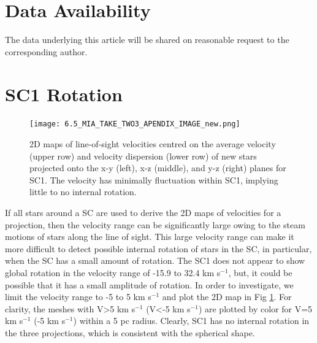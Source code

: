 \documentclass[fleqn,usenatbib]{mnras}
\begin{document}
\section*{Data Availability}

The data underlying this article will be shared on reasonable request to the corresponding author.













\appendix
\section{SC1 Rotation}

\begin{figure}
 \texttt{[image: 6.5\_MIA\_TAKE\_TWO3\_APENDIX\_IMAGE\_new.png]}
 \caption{2D maps of line-of-sight velocities centred on the average velocity (upper row) and velocity dispersion (lower row) of new stars projected onto the x-y (left), x-z (middle), and y-z (right) planes for SC1. The velocity has minimally fluctuation within SC1, implying little to no internal rotation.}
 \label{fig:ApRotation}
\end{figure}
If all stars around a SC are used to derive the 2D maps of velocities for a projection, then the velocity range can be significantly large owing to the steam motions of stars along the line of sight. This large velocity range can make it more difficult to detect possible internal rotation of stars in the SC, in particular, when the SC has a small amount of rotation.  The SC1 does not appear to show global rotation in
the velocity range of -15.9 to 32.4 km s$^{-1}$, but, it could be possible that it has a small amplitude of rotation. In order to investigate, we limit the velocity range to -5 to 5 km s$^{-1}$ and plot the 2D map in Fig \ref{fig:ApRotation}. For clarity, the meshes with V>5 km s$^{-1}$ (V<-5 km s$^{-1}$) are plotted by color for V=5 km s$^{-1}$ (-5 km s$^{-1}$) within a 5 pc radius. Clearly, SC1 has no internal rotation in the three projections, which is consistent with the spherical shape.


\bsp	%
\label{lastpage}
\end{document}
